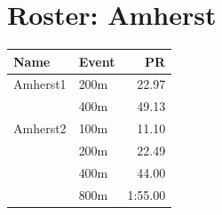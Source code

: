 \documentclass[11pt]{article}
\begin{document}
\section*{Roster: Amherst}
\begin{tabularx}{\textwidth}{lXr}
\toprule
\textbf{Name} & \textbf{Event} & \textbf{PR} \\
\midrule
Amherst1 & 200m & 22.97 \\
& 400m & 49.13 \\
\midrule
Amherst2 & 100m & 11.10 \\
& 200m & 22.49 \\
& 400m & 44.00 \\
& 800m & 1:55.00 \\
\midrule
\bottomrule
\end{tabularx}
\end{document}
